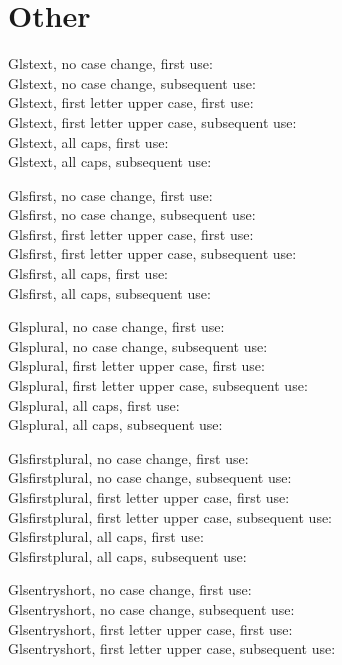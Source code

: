 \documentclass[10pt,a4paper]{book}
\begin{document}
\section{Other}
Glstext, no case change, first use: \\
Glstext, no case change, subsequent use: \\
Glstext, first letter upper case, first use: \\
Glstext, first letter upper case, subsequent use: \\
Glstext, all caps, first use: \\
Glstext, all caps, subsequent use: 

Glsfirst, no case change, first use: \\
Glsfirst, no case change, subsequent use: \\
Glsfirst, first letter upper case, first use: \\
Glsfirst, first letter upper case, subsequent use: \\
Glsfirst, all caps, first use: \\
Glsfirst, all caps, subsequent use: 

Glsplural, no case change, first use: \\
Glsplural, no case change, subsequent use: \\
Glsplural, first letter upper case, first use: \\
Glsplural, first letter upper case, subsequent use: \\
Glsplural, all caps, first use: \\
Glsplural, all caps, subsequent use: 

Glsfirstplural, no case change, first use: \\
Glsfirstplural, no case change, subsequent use: \\
Glsfirstplural, first letter upper case, first use: \\
Glsfirstplural, first letter upper case, subsequent use: \\
Glsfirstplural, all caps, first use: \\
Glsfirstplural, all caps, subsequent use: 

Glsentryshort, no case change, first use: \\
Glsentryshort, no case change, subsequent use: \\
Glsentryshort, first letter upper case, first use: \\
Glsentryshort, first letter upper case, subsequent use: 

\end{document}
